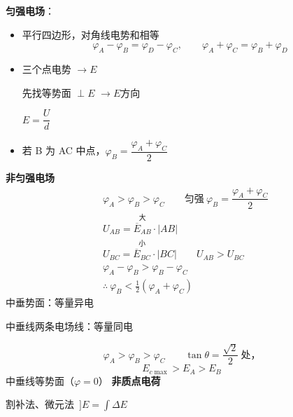 \textbf{匀强电场}：
\begin{itemize}
\item 平行四边形，对角线电势和相等
\[
\varphi_A-\varphi_B=\varphi_D-\varphi_C,\qquad \varphi_A+\varphi_C=\varphi_B+\varphi_D
\]
\item 三个点电势 $\to E$

先找等势面 $\perp E$ $\to E$方向

$E=\dfrac{U}{d}$
\item %
若 B 为 AC 中点，$\varphi_B=\dfrac{\varphi_A+\varphi_C}{2}$
\end{itemize}
\textbf{非匀强电场}
\begin{align*}
&\varphi_A>\varphi_B>\varphi_C\qquad\text{匀强}\ \varphi_B=\dfrac{\varphi_A+\varphi_C}{2}\\
&U_{AB}=\overset{\text{大}}{\overline{E}_{AB}}\cdot|AB|\\
&U_{BC}=\overset{\text{小}}{\overline{E}_{BC}}\cdot|BC|\qquad U_{AB}>U_{BC}\\
&\varphi_A-\varphi_B>\varphi_B-\varphi_C\\
&\therefore\ \varphi_B<\tfrac{1}{2}(\varphi_A+\varphi_C)
\end{align*}
中垂势面：等量异电

中垂线\unclear{/}两条电场线：等量同电

\begin{keybox}
\quad{} %
\end{keybox}

\[
\varphi_A>\varphi_B>\varphi_C\qquad \tan\theta=\frac{\sqrt{2}}{2}\ \text{处，}
\]
\[
E_{c\max}>E_A>E_B
\]
中垂线等势面（$\varphi=0$）
\textbf{非质点电荷}

割补法、微元法\ $\rbrack$\quad $E=\int\Delta E$

